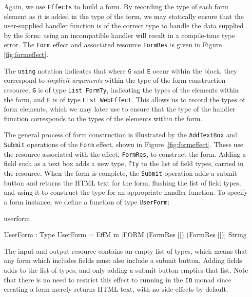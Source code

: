 \noindent
Again, we use \texttt{Effects} to build a form.
By recording
the type of each form element as it is added in the type of the form, we may
statically ensure that the user-supplied handler function is of the correct
type to handle the data supplied by the form: using an
incompatible handler will result in a compile-time type error. The \texttt{Form}
effect and associated resource \texttt{FormRes} is given in Figure 
\ref{fig:formeffect}.

The \texttt{using} notation indicates that where \texttt{G} and \texttt{E} occur within the block, they correspond to \emph{implicit arguments} within the type of the form construction resource. 
\texttt{G} is of type \texttt{List FormTy}, indicating the types of the elements within the form, and \texttt{E} is of type \texttt{List WebEffect}. This allows us to record the types of form elements, which we may later use to ensure that the type of the handler function corresponds to the types of the elements within the form.

The general process of form construction is illustrated by the \texttt{AddTextBox}
and \texttt{Submit} operations of the \texttt{Form} effect, shown in Figure~\ref{fig:formeffect}. These use the resource associated with the effect, \texttt{FormRes}, to construct the form. Adding a field such as a text box adds a new type,
\texttt{fty} to the list of field types, carried in the resource. When the form
is complete, the \texttt{Submit} operation adds a submit button and returns the
HTML text for the form, flushing the list of field types, and using it to
construct the type for an appropriate handler function.
%
To specify a form instance, we define a function of type \texttt{UserForm}:

\begin{SaveVerbatim}{userform}

UserForm : Type
UserForm = EffM m [FORM (FormRes []) 
                        (FormRes [])] String
\end{SaveVerbatim}

\noindent
%
The input and output resource contains an empty list of types, which means that
any form which includes fields must also include a submit button. Adding fields
adds to the list of types, and only adding a submit button empties that list.
Note that there is no need to restrict this effect to running in the \texttt{IO}
monad since creating a form merely returns HTML text, with no side-effects by
default.


